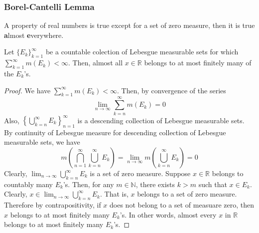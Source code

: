 \subsubsection{Borel-Cantelli Lemma}
\begin{definition}[ae]
	A property of real numbers is true except for a set of zero measure, then it is true \textbf{a}lmost \textbf{e}verywhere.
\end{definition}

\begin{lemma}
	Let $\{E_k\}_{k=1}^\infty$ be a countable colection of Lebesgue measurable sets for which $\sum_{k=1}^\infty m(E_k) < \infty$.
	Then, almost all $x \in \mathbb{R}$ belongs to at most finitely many of the $E_k$'s.
	\label{lem:borelcantelli}
\end{lemma}
\begin{proof}
	We have $\sum_{k=1}^\infty m(E_k) < \infty$.
	Then, by convergence of the series 
	\[ \lim_{n \to \infty} \sum_{k=n}^\infty m(E_k) = 0 \]
	Also, $\displaystyle \left\{ \bigcup_{k=n}^\infty E_k \right\}_{n=1}^\infty$ is a descending collection of Lebesgue measurable sets.
	By continuity of Lebesgue measure for descending collection of Lebesgue measurable sets, we have
	\begin{equation*}
		m \left( \bigcap_{n=1}^\infty \bigcup_{k=n}^\infty E_k \right) = \lim_{n \to \infty} m \left( \bigcup_{k=n}^\infty E_k \right) = 0
	\end{equation*}
	Clearly, $\displaystyle \lim_{n \to \infty} \bigcup_{k =n}^\infty E_k$ is a set of zero measure.
	Suppose $x \in \mathbb{R}$ belongs to countably many $E_k$'s.
	Then, for any $m \in \mathbb{N}$, there exists $k > m$ such that  $x \in E_k$.
	Clearly, $\displaystyle x \in \lim_{n \to \infty} \bigcup_{k=n}^\infty E_k$.
	That is, $x$ belongs to a set of zero measure.
	Therefore by contrapositivity, if $x$ does not belong to a set of measuare zero, then $x$ belongs to at most finitely many $E_k$'s.	
	In other words, almost every $x$ in $\mathbb{R}$ belongs to at most finitely many $E_k$'s.
\end{proof}

